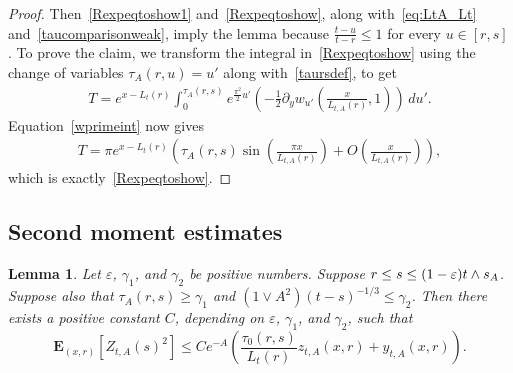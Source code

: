 \documentclass[10pt]{amsart}
\newtheorem{lemm}[theo]{Lemma}\newtheorem{prop}[theo]{Proposition}\newtheorem{coro}[theo]{Corollary}\newtheorem{conj}[theo]{Conjecture}
\theoremstyle{definition}\newtheorem{defi}[theo]{Definition}\newtheorem{rema}[theo]{Remark}\newtheorem{exam}[theo]{Example}\newtheorem{exem}[theo]{Example}\newtheorem{nota}[theo]{Notation}
\newcommand*\eps{\varepsilon}
\newcommand*\E{\mathbf{E}}
\newcommand{\1} {\mathds{1}}
\begin{document}
\begin{proof}
Then~\eqref{Rexpeqtoshow1} and~\eqref{Rexpeqtoshow}, along with~\eqref{eq:LtA_Lt} and~\eqref{taucomparisonweak}, imply the lemma because $\frac{t-u}{t-r} \le 1$ for every $u\in [r,s]$. To prove the claim, we transform the integral in~\eqref{Rexpeqtoshow} using the change of variables $\tau_A(r,u) = u'$ along with~\eqref{taursdef}, to get
\begin{align*}
T= e^{x-L_t(r)} \int_0^{\tau_A(r,s)} e^{\frac{\pi^2}2 u'} \left(-\frac 1 2 \partial_y w_{u'} \left(\frac{x}{L_{t,A}(r)}, 1 \right)\right)\,du'.
\end{align*}
Equation~\eqref{wprimeint} now gives
\begin{align*}
T = \pi e^{x-L_t(r)} \left(\tau_A(r,s) \sin\left(\frac{\pi x}{L_{t,A}(r)}\right) + O\left(\frac{x}{L_{t,A}(r)}\right)\right),
\end{align*}
which is exactly~\eqref{Rexpeqtoshow}.
\end{proof}

\subsection{Second moment estimates}\label{sec:second_moment_estimates}

\begin{lemm}\label{lem:Zvar}
Let $\eps$, $\gamma_1$, and $\gamma_2$ be positive numbers. Suppose $r \le s \leq (1 - \eps) t\linebreak\wedge s_A$. Suppose also that $\tau_A(r,s) \geq \gamma_1$ and $(1 \vee A^2)(t - s)^{-1/3} \leq \gamma_2$. Then there exists a positive constant $C$, depending on $\eps$, $\gamma_1$, and $\gamma_2$, such that
\[
\E_{(x,r)}\left[Z_{t,A}(s)^2\right] \leq C e^{-A} \left(\frac{\tau_0(r,s)}{L_t(r)} z_{t,A}(x,r) + y_{t,A}(x,r)\right).
\]
\end{lemm}
\end{document}
